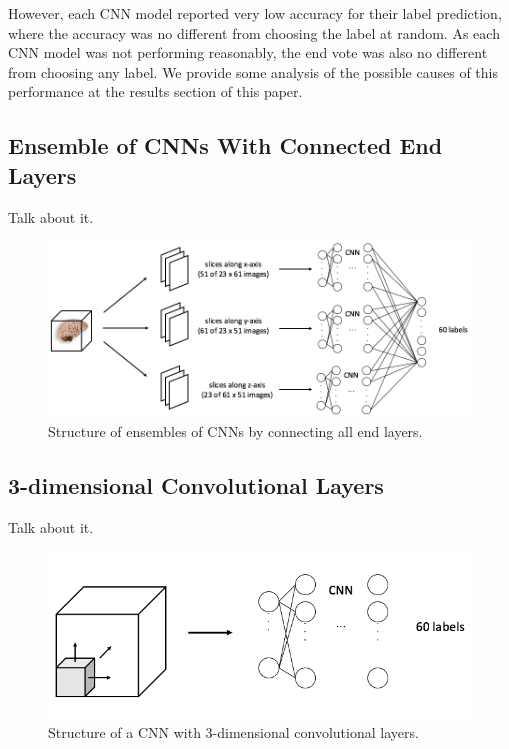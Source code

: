 \documentclass{article} %
\begin{document}
However, each CNN model reported very low accuracy for their label prediction, where the accuracy was no different from choosing the label at random. As each CNN model was not performing reasonably, the end vote was also no different from choosing any label. We provide some analysis of the possible causes of this performance at the results section of this paper.

\subsection{Ensemble of CNNs With Connected End Layers}

Talk about it.

\begin{figure}[H]
	\centering
	\includegraphics[height=0.26\textheight]{./img/cnn_proto_b.png}
	\caption{Structure of ensembles of CNNs by connecting all end layers.}
\end{figure}

\subsection{3-dimensional Convolutional Layers}

Talk about it.

\begin{figure}[H]
	\centering
	\includegraphics[height=0.2\textheight]{./img/cnn_proto_c.png}
	\caption{Structure of a CNN with 3-dimensional convolutional layers.}
\end{figure}
\end{document}
